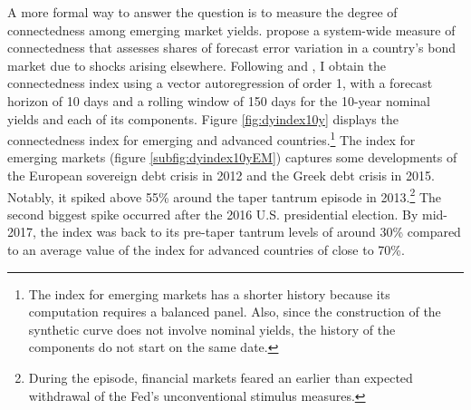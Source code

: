 {A more formal way to answer the question is to measure the degree of connectedness among emerging market yields.
\cite{DieboldYilmaz:2014} propose a system-wide measure of connectedness 
that assesses shares of forecast error variation in a country's bond market due to shocks arising elsewhere.
Following \cite{ACDM:2019} and \cite{BostanciYilmaz:2020}, I obtain the connectedness index using a vector autoregression of order 1, with a forecast horizon of 10 days and a rolling window of 150 days for the 10-year nominal yields 
and each of its components.
Figure \ref{fig:dyindex10y} displays the connectedness index for emerging and advanced countries.\footnote{ The index for emerging markets has a shorter history because its computation requires a balanced panel. Also, since the construction of the synthetic curve does not involve nominal yields, the history of the components do not start on the same date.} 
The index for emerging markets (figure \ref{subfig:dyindex10yEM}) captures some developments of the European sovereign debt crisis in 2012 and  the Greek debt crisis in 2015.
Notably, it spiked above 55\% around the taper tantrum episode in 2013.\footnote{ During the episode, financial markets feared an earlier than expected withdrawal of the Fed's unconventional stimulus measures.} %
The second biggest spike %
occurred after the 2016 U.S. presidential election.
By mid-2017, the index was back to its pre-taper tantrum levels of around 30\% compared to an average value of the index for advanced countries of close to 70\%.

}
